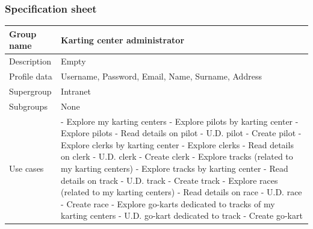 \documentclass{beamer}
\begin{document}
\begin{frame}
\frametitle{Specification sheet}
\begin{table}
    \tiny
    \begin{tabular}{|p{2cm}|p{6cm}|}
    \hline
    Group name & \textbf{Karting center administrator} \\
    \hline
    Description & Empty \\
    \hline
    Profile data & Username, Password, Email, Name, Surname, Address \\
    Supergroup & Intranet \\
    \hline
    Subgroups & None \\
    \hline
    Use cases & 
    - Explore my karting centers \newline
    - Explore pilots by karting center \newline
    - Explore pilots \newline
    - Read details on pilot \newline
    - U.D. pilot \newline
    - Create pilot \newline
    - Explore clerks by karting center \newline
    - Explore clerks \newline
    - Read details on clerk \newline
    - U.D. clerk \newline
    - Create clerk \newline
    - Explore tracks (related to my karting centers)\newline
    - Explore tracks by karting center \newline
    - Read details on track \newline
    - U.D. track \newline
    - Create track \newline
    - Explore races (related to my karting centers) \newline
    - Read details on race \newline
    - U.D. race \newline
    - Create race \newline
    - Explore go-karts dedicated to tracks of my karting centers \newline
    - U.D. go-kart dedicated to track \newline
    - Create go-kart \\
    \hline
    \end{tabular}
\end{table}
\end{frame}
\end{document}
